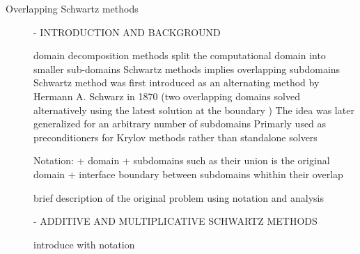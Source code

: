 \begin{description}

\item[Overlapping Schwartz methods]

- INTRODUCTION AND BACKGROUND

domain decomposition methods split the computational domain into smaller sub-domains
Schwartz methods implies overlapping subdomains
Schwartz method was first introduced as an alternating method by Hermann A. Schwarz in 1870 (two overlapping domains solved alternatively using the latest solution at the boundary  )
The idea was later generalized for an arbitrary number of subdomains
Primarly used as preconditioners for Krylov methods rather than standalone solvers

Notation: 
+ domain
+ subdomains such as their union is the original domain
+ interface boundary between subdomains whithin their overlap

brief description of the original problem using notation and analysis



- ADDITIVE AND MULTIPLICATIVE SCHWARTZ METHODS

introduce with notation


\end{description}
